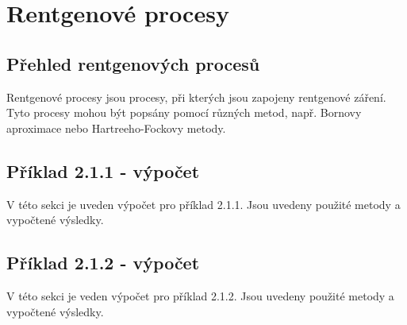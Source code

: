 \section{Rentgenové procesy}

\subsection{Přehled rentgenových procesů}

Rentgenové procesy jsou procesy, při kterých jsou zapojeny rentgenové záření. Tyto procesy mohou být popsány pomocí různých metod, např. Bornovy aproximace nebo Hartreeho-Fockovy metody.

\subsection{Příklad 2.1.1 - výpočet}
\begin{zadani}

\end{zadani}


V této sekci je uveden výpočet pro příklad 2.1.1. Jsou uvedeny použité metody a vypočtené výsledky.

\subsection{Příklad 2.1.2 - výpočet}
\begin{zadani}

\end{zadani}


V této sekci je veden výpočet pro příklad 2.1.2. Jsou uvedeny použité metody a vypočtené výsledky.
